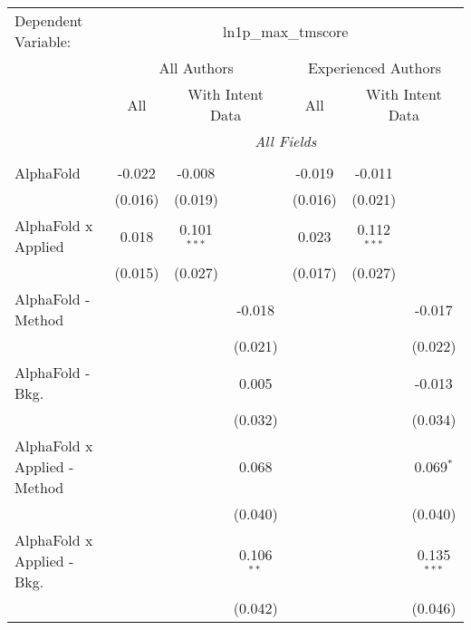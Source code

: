 \begingroup
\centering
\begin{tabular}{lcccccc}
   \tabularnewline \midrule \midrule
   Dependent Variable: & \multicolumn{6}{c}{ln1p\_max\_tmscore}\\
 & \multicolumn{3}{c}{All Authors} & \multicolumn{3}{c}{Experienced Authors} \\
\cmidrule(lr){2-4} \cmidrule(lr){5-7}
 & \multicolumn{1}{c}{All} & \multicolumn{2}{c}{With Intent Data} & \multicolumn{1}{c}{All} & \multicolumn{2}{c}{With Intent Data} \\
\cmidrule(lr){2-2} \cmidrule(lr){3-4} \cmidrule(lr){5-5} \cmidrule(lr){6-7}
 & \multicolumn{6}{c}{\textit{All Fields}} \\ \\
   AlphaFold                      & -0.022  & -0.008        &                & -0.019       & -0.011        &   \\   
                                  & (0.016) & (0.019)       &                & (0.016)      & (0.021)       &   \\   
   AlphaFold x Applied            & 0.018   & 0.101$^{***}$ &                & 0.023        & 0.112$^{***}$ &   \\   
                                  & (0.015) & (0.027)       &                & (0.017)      & (0.027)       &   \\   
   AlphaFold - Method             &         &               & -0.018         &              &               & -0.017\\   
                                  &         &               & (0.021)        &              &               & (0.022)\\   
   AlphaFold - Bkg.               &         &               & 0.005          &              &               & -0.013\\   
                                  &         &               & (0.032)        &              &               & (0.034)\\   
   AlphaFold x Applied - Method   &         &               & 0.068          &              &               & 0.069$^{*}$\\   
                                  &         &               & (0.040)        &              &               & (0.040)\\   
   AlphaFold x Applied - Bkg.     &         &               & 0.106$^{**}$   &              &               & 0.135$^{***}$\\   
                                  &         &               & (0.042)        &              &               & (0.046)\\   

\end{tabular}
